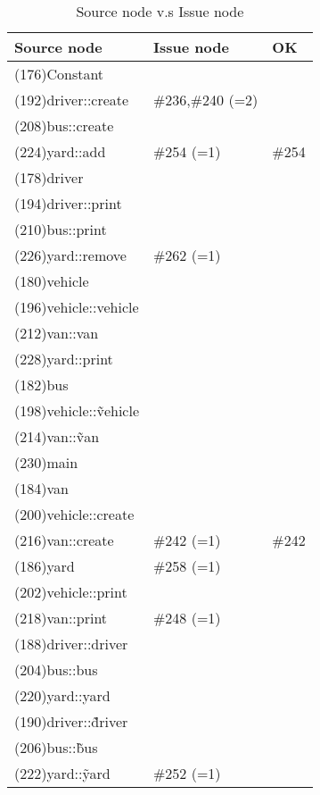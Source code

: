 \begin{table}[hb]
\begin{center}
\begin{tabular}{|l|l|l|}
\hline
Source node & Issue node & OK \\
\hline
(176)Constant & & \\
(192)driver::create & \#236,\#240 (=2)& \\
(208)bus::create & & \\
(224)yard::add & \#254 (=1)& \#254 \\
(178)driver & & \\
(194)driver::print & & \\
(210)bus::print & & \\
(226)yard::remove & \#262 (=1)& \\
(180)vehicle & & \\
(196)vehicle::vehicle & & \\
(212)van::van & & \\
(228)yard::print & & \\
(182)bus & & \\
(198)vehicle::\~vehicle & & \\
(214)van::\~van & & \\
(230)main & & \\
(184)van & & \\
(200)vehicle::create & & \\
(216)van::create & \#242 (=1)& \#242\\
(186)yard & \#258 (=1)& \\
(202)vehicle::print & & \\
(218)van::print & \#248 (=1)& \\
(188)driver::driver & & \\
(204)bus::bus & & \\
(220)yard::yard & & \\
(190)driver::\~driver & & \\
(206)bus::\~bus & & \\
(222)yard::\~yard & \#252 (=1)& \\
\hline
\end{tabular}
\caption{Source node v.s Issue node}
\end{center}
\end{table}

